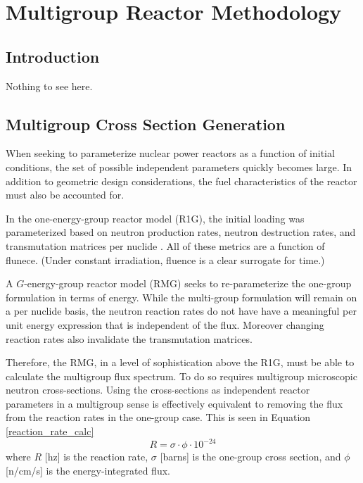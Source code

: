 \chapter{Multigroup Reactor Methodology}

\section{Introduction}
Nothing to see here.

\section{Multigroup Cross Section Generation}
When seeking to parameterize nuclear power reactors as a function of initial conditions, 
the set of possible independent parameters quickly becomes large. In addition to geometric 
design considerations, the fuel characteristics of the reactor must also be accounted for.

In the one-energy-group reactor model (R1G), the initial loading was parameterized based
on neutron production rates, neutron destruction rates, and transmutation matrices per
nuclide \cite{Scopatz2009d}.  All of these metrics are a function of flunece.  (Under 
constant irradiation, fluence is a clear surrogate for time.)

A $G$-energy-group reactor model (RMG) seeks to re-parameterize the one-group formulation 
in terms of energy.  While the multi-group formulation will remain on a per nuclide basis, 
the neutron reaction rates do not have have a meaningful per unit energy expression that 
is independent of the flux.  Moreover changing reaction rates also invalidate the 
transmutation matrices.  

Therefore, the RMG, in a level of sophistication above the R1G, must be able to calculate
the multigroup flux spectrum.  To do so requires multigroup microscopic neutron cross-sections.  
Using the cross-sections as independent reactor parameters in a multigroup sense is 
effectively equivalent to removing the flux from the reaction rates in the one-group case.
This is seen in Equation \ref{reaction_rate_calc}
\begin{equation}
\label{reaction_rate_calc}
R = \sigma \cdot \phi \cdot 10^{-24}
\end{equation}
where $R$ [hz] is the reaction rate, $\sigma$ [barns] is the one-group cross section, and
$\phi$ [n/cm/s] is the energy-integrated flux.

